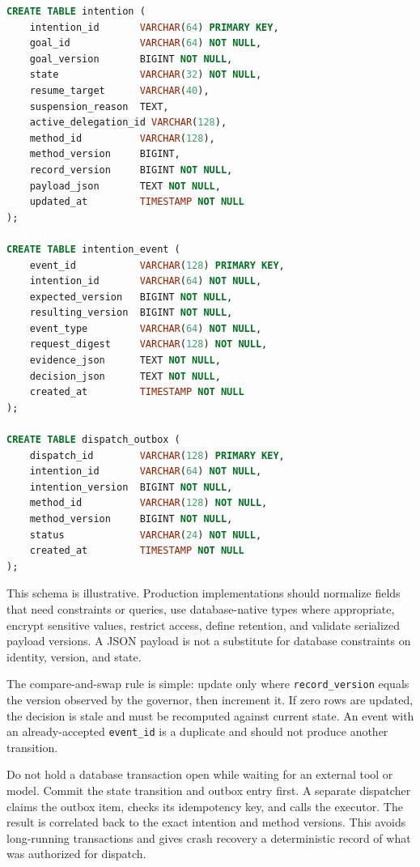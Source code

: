 \begin{lstlisting}[language=SQL,caption={Illustrative persistence tables for an intention aggregate},label={lst:ch15-schema}]
CREATE TABLE intention (
    intention_id       VARCHAR(64) PRIMARY KEY,
    goal_id            VARCHAR(64) NOT NULL,
    goal_version       BIGINT NOT NULL,
    state              VARCHAR(32) NOT NULL,
    resume_target      VARCHAR(40),
    suspension_reason  TEXT,
    active_delegation_id VARCHAR(128),
    method_id          VARCHAR(128),
    method_version     BIGINT,
    record_version     BIGINT NOT NULL,
    payload_json       TEXT NOT NULL,
    updated_at         TIMESTAMP NOT NULL
);

CREATE TABLE intention_event (
    event_id           VARCHAR(128) PRIMARY KEY,
    intention_id       VARCHAR(64) NOT NULL,
    expected_version   BIGINT NOT NULL,
    resulting_version  BIGINT NOT NULL,
    event_type         VARCHAR(64) NOT NULL,
    request_digest     VARCHAR(128) NOT NULL,
    evidence_json      TEXT NOT NULL,
    decision_json      TEXT NOT NULL,
    created_at         TIMESTAMP NOT NULL
);

CREATE TABLE dispatch_outbox (
    dispatch_id        VARCHAR(128) PRIMARY KEY,
    intention_id       VARCHAR(64) NOT NULL,
    intention_version  BIGINT NOT NULL,
    method_id          VARCHAR(128) NOT NULL,
    method_version     BIGINT NOT NULL,
    status             VARCHAR(24) NOT NULL,
    created_at         TIMESTAMP NOT NULL
);
\end{lstlisting}

This schema is illustrative. Production implementations should normalize fields that need constraints or queries, use database-native types where appropriate, encrypt sensitive values, restrict access, define retention, and validate serialized payload versions. A JSON payload is not a substitute for database constraints on identity, version, and state.

The compare-and-swap rule is simple: update only where \texttt{record\_\allowbreak version} equals the version observed by the governor, then increment it. If zero rows are updated, the decision is stale and must be recomputed against current state. An event with an already-accepted \texttt{event\_id} is a duplicate and should not produce another transition.

Do not hold a database transaction open while waiting for an external tool or model. Commit the state transition and outbox entry first. A separate dispatcher claims the outbox item, checks its idempotency key, and calls the executor. The result is correlated back to the exact intention and method versions. This avoids long-running transactions and gives crash recovery a deterministic record of what was authorized for dispatch.

